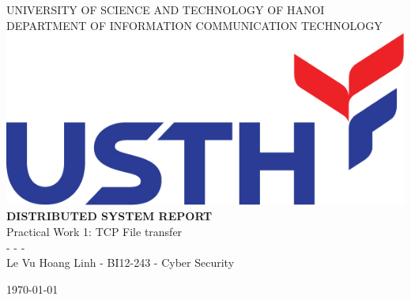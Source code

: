 \begin{titlepage}
    \centering
    UNIVERSITY OF SCIENCE AND TECHNOLOGY OF HANOI \\ 
    DEPARTMENT OF INFORMATION COMMUNICATION TECHNOLOGY\\
    \vspace{1cm}
    \includegraphics[width=0.45\linewidth]{usth-logo.jpg} \\ %
    \vspace{4cm}
    {\LARGE \textbf{DISTRIBUTED SYSTEM REPORT}} \\
    \vspace{0.5cm}
    {\Large Practical Work 1: TCP File transfer} \\
    \vspace{0.3cm}
    - - -\\
    \vspace{0.3cm}
    \large Le Vu Hoang Linh - BI12-243 - Cyber Security

    \vspace{6.5cm}
    {\small \today} %
\end{titlepage}